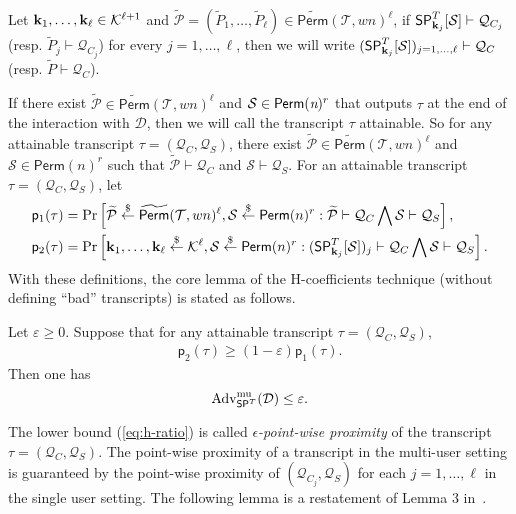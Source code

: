 Let $\mathbf{k}_1, \ldots ,\mathbf{k}_{\ell} \in \mathcal{K}^{\ell+1}$ and $\widetilde{\mathcal{P}} = (\widetilde{P}_1, \ldots ,\widetilde{P}_\ell) \in \widetilde{\mathsf{Perm}}(\mathcal{T},wn)^\ell$, if $\mathsf{SP}_{\mathbf{k}_j}^T[\mathcal{S}]\vdash\mathcal{Q}_{C_j}$ (resp. $\widetilde{P}_j\vdash\mathcal{Q}_{C_j}$) for every $j = 1, \ldots ,\ell$, then we will write $(\mathsf{SP}_{\mathbf{k}_j}^{T}[\mathcal{S}])_{j = 1, \ldots ,\ell} \vdash \mathcal{Q}_C$ (resp. $\widetilde{P}\vdash\mathcal{Q}_{C}$).


If there exist $\widetilde{\mathcal{P}} \in \widetilde{\mathsf{Perm}}(\mathcal{T},w n)^\ell$ and $\mathcal{S} \in \mathsf{Perm}(\emph{n})^r$ that outputs $\tau$ at the end of the interaction with $\mathcal{D}$, then we will call the transcript $\tau$ attainable. So for any attainable transcript $\tau= (\mathcal{Q}_C,\mathcal{Q}_S)$, there exist $\widetilde{\mathcal{P}} \in \widetilde{\mathsf{Perm}}(\mathcal{T},w n)^\ell$ and $\mathcal{S} \in \mathsf{Perm}(n)^r$ such that $\widetilde{\mathcal{P}}\vdash\mathcal{Q}_C$ and $\mathcal{S}\vdash\mathcal{Q}_S$. For an attainable transcript $\tau = (\mathcal{Q}_C,\mathcal{Q}_S)$, let
%
%
$$
\begin{aligned}
&\mathsf{p}_{1}(\tau)=\operatorname{Pr}\left[\widetilde{\mathcal{P}} \stackrel{\$}{\leftarrow} \widetilde{{\mathsf{Perm}}}(\mathcal{T}, w n)^{\ell}, \mathcal{S} \stackrel{\$}{\leftarrow} \mathsf{Perm}(n)^{r}: \widetilde{\mathcal{P}} \vdash \mathcal{Q}_{C} \bigwedge \mathcal{S} \vdash \mathcal{Q}_{S}\right],\\
&\mathsf{p}_{2}(\tau)=\operatorname{Pr}\left[\mathbf{k}_{1}, \ldots, \mathbf{k}_{\ell} \stackrel{\$}{\leftarrow} \mathcal{K}^{\ell}, \mathcal{S} \stackrel{\$}{\leftarrow} \mathsf{Perm}(n)^{r}:(\mathsf{SP}_{\mathbf{k}_{j}}^{T}[\mathcal{S}])_{j} \vdash \mathcal{Q}_{C} \bigwedge \mathcal{S} \vdash \mathcal{Q}_{S}\right].
\end{aligned}
$$
%
%
With these definitions, the core lemma of the H-coefficients technique (without defining ``bad'' transcripts) is stated as follows.


\begin{lemma}
	\label{lemma:h-coeff}
	
	Let $\varepsilon \geq 0$. Suppose that for any attainable transcript $\tau = (\mathcal{Q}_C,\mathcal{Q}_S)$,
	\begin{align}
	\mathsf{p}_{2}(\tau) \geq (1 - \varepsilon) \mathsf{p}_{1}(\tau).
	\label{eq:h-ratio}
	\end{align}
	Then one has
	$$
	\operatorname{Adv}^{\mathrm{mu}}_{\mathsf{SP}^T}(\mathcal{D}) \leq \varepsilon.
	$$
\end{lemma}
%
%
The lower bound (\ref{eq:h-ratio}) is called \emph{$\epsilon$-point-wise proximity} of the transcript $\tau = (\mathcal{Q}_C, \mathcal{Q}_S)$. The point-wise proximity of a transcript in the multi-user setting is guaranteed by the point-wise proximity of $(\mathcal{Q}_{C_{j}}, \mathcal{Q}_S)$ for each $j = 1, \ldots ,\ell$ in the single user setting. The following lemma is a restatement of Lemma 3  in~\cite{C:HoaTes16}.


